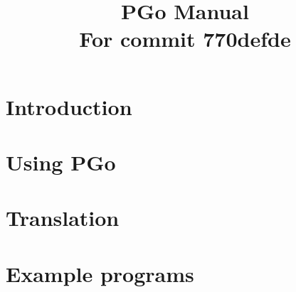 \documentclass[notitlepage]{article}
\title{PGo Manual\\
	\normalsize{For commit 770defde}}
\begin{document}
\maketitle

\section{Introduction}


\section{Using PGo}


\section{Translation}


\section{Example programs}

\end{document}
